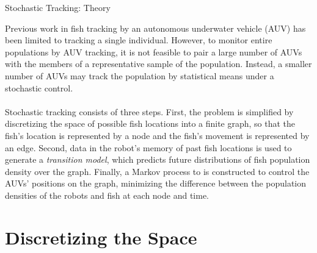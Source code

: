 \documentclass[11pt,letterpaper]{article}
\author{Kevin Smith}
\begin{document}
	
	\begin{center}
		\Huge{Stochastic Tracking: Theory}
	\end{center}
	
	Previous work in fish tracking by an autonomous underwater vehicle (AUV) has been limited to tracking a single individual. However, to monitor entire populations by AUV tracking, it is not feasible to pair a large number of AUVs with the members of a representative sample of the population. Instead, a smaller number of AUVs may track the population by statistical means under a stochastic control. 
	\\\\
	Stochastic tracking consists of three steps. First, the problem is simplified by discretizing the space of possible fish locations into a finite graph, so that the fish's location is represented by a node and the fish's movement is represented by an edge. Second, data in the robot's memory of past fish locations is used to generate a \textit{transition model}, which predicts future distributions of fish population density over the graph. Finally, a Markov process to is constructed to control the AUVs' positions on the graph, minimizing the difference between the population densities of the robots and fish at each node and time.
	
	\section{Discretizing the Space}
	
\end{document}
